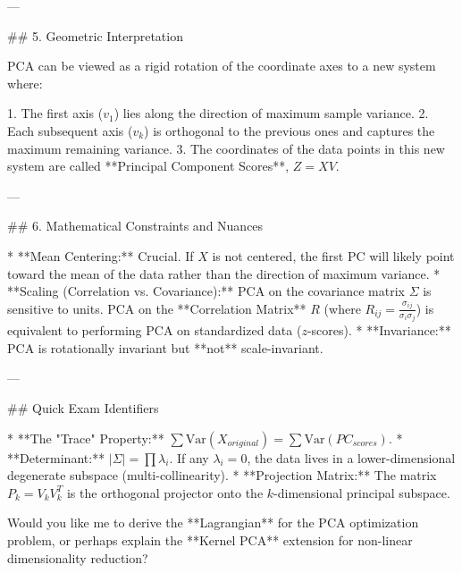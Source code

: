 ---

## 5. Geometric Interpretation

PCA can be viewed as a rigid rotation of the coordinate axes to a new system where:

1. The first axis (\( v_1 \)) lies along the direction of maximum sample variance.
2. Each subsequent axis (\( v_k \)) is orthogonal to the previous ones and captures the maximum remaining variance.
3. The coordinates of the data points in this new system are called **Principal Component Scores**, \( Z = XV \).

---

## 6. Mathematical Constraints and Nuances

* **Mean Centering:** Crucial. If \( X \) is not centered, the first PC will likely point toward the mean of the data rather than the direction of maximum variance.
* **Scaling (Correlation vs. Covariance):** PCA on the covariance matrix \( \Sigma \) is sensitive to units. PCA on the **Correlation Matrix** \( R \) (where \( R_{ij} = \frac{\sigma_{ij}}{\sigma_i \sigma_j} \)) is equivalent to performing PCA on standardized data (\( z \)-scores).
* **Invariance:** PCA is rotationally invariant but **not** scale-invariant.

---

## Quick Exam Identifiers

* **The "Trace" Property:** \( \sum \text{Var}(X_{original}) = \sum \text{Var}(PC_{scores}) \).
* **Determinant:** \( |\Sigma| = \prod \lambda_i \). If any \( \lambda_i = 0 \), the data lives in a lower-dimensional degenerate subspace (multi-collinearity).
* **Projection Matrix:** The matrix \( P_k = V_k V_k^T \) is the orthogonal projector onto the \( k \)-dimensional principal subspace.

Would you like me to derive the **Lagrangian** for the PCA optimization problem, or perhaps explain the **Kernel PCA** extension for non-linear dimensionality reduction?
